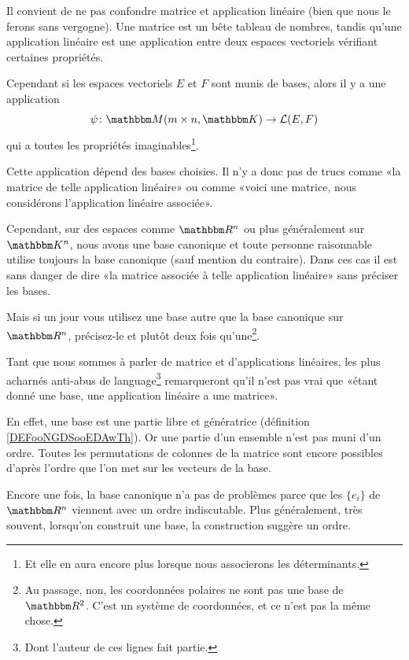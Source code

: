 \begin{normaltext}
    Il convient de ne pas confondre matrice et application linéaire (bien que nous le ferons sans vergogne). Une matrice est un bête tableau de nombres, tandis qu'une application linéaire est une application entre deux espaces vectoriels vérifiant certaines propriétés.

    Cependant si les espaces vectoriels \( E\) et \( F\) sont munis de bases, alors il y a une application
    \begin{equation}
        \psi\colon \eM(m\times n,\eK)\to \aL(E,F)
    \end{equation}
    qui a toutes les propriétés imaginables\footnote{Et elle en aura encore plus lorsque nous associerons les déterminants.}.

    Cette application dépend des bases choisies. Il n'y a donc pas de trucs comme «la matrice de telle application linéaire» ou comme «voici une matrice, nous considérons l'application linéaire associée». 

    Cependant, sur des espaces comme \( \eR^n\) ou plus généralement sur \( \eK^n\), nous avons une base canonique et toute personne raisonnable utilise toujours la base canonique (sauf mention du contraire). Dans ces cas il est sans danger de dire «la matrice associée à telle application linéaire» sans préciser les bases.

    Mais si un jour vous utilisez une base autre que la base canonique sur \( \eR^n\), précisez-le et plutôt deux fois qu'une\footnote{Au passage, non, les coordonnées polaires ne sont pas une base de \( \eR^2\). C'est un système de coordonnées, et ce n'est pas la même chose.}.
\end{normaltext}

\begin{normaltext}
    Tant que nous sommes à parler de matrice et d'applications linéaires, les plus acharnés anti-abus de language\footnote{Dont l'auteur de ces lignes fait partie.} remarqueront qu'il n'est pas vrai que «étant donné une base, une application linéaire a une matrice».

    En effet, une base est une partie libre et génératrice (définition \ref{DEFooNGDSooEDAwTh}). Or une partie d'un ensemble n'est pas muni d'un ordre. Toutes les permutations de colonnes de la matrice sont encore possibles d'après l'ordre que l'on met sur les vecteurs de la base.

    Encore une fois, la base canonique n'a pas de problèmes parce que les \( \{ e_i \}\) de \( \eR^n\) viennent avec un ordre indiscutable. Plus généralement, très souvent, lorsqu'on construit une base, la construction suggère un ordre.
\end{normaltext}


